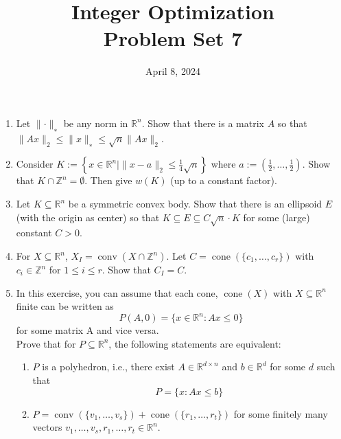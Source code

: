 \documentclass[11pt,a4paper]{article}
\title{Integer Optimization  \\ Problem Set 7 }
\date{ April 8, 2024}
\renewcommand{\leq}{\leqslant}
\DeclareMathOperator{\conv}{conv}
\DeclareMathOperator{\cone}{cone}
\begin{document}
\maketitle 


\begin{enumerate}

\item Let $∥\cdot∥_∗$ be any norm in $\mathbb{R}^n$. Show that there is a matrix $A$ so that $∥Ax∥_2 \leq ∥x∥_∗ \leq \sqrt{n}∥Ax∥_2$.

\item Consider $K:= \left\{x∈\mathbb{R}^n |∥x−a∥_2 \leq \frac{1}{4}\sqrt{n}\right\}$ where $a:=\left(\frac{1}{2},\hdots,\frac{1}{2}\right)$. Show that $K∩\mathbb{Z}^n =\emptyset$. Then give $w(K)$ (up to a constant factor).

\item Let $K ⊆\mathbb{R}^n$ be a symmetric convex body. Show that there is an ellipsoid $E$ (with the origin as center) so that $K ⊆ E ⊆ C\sqrt{n}\cdot K$ for some (large) constant $C >0$.

\item For $X⊆\mathbb{R}^n$, $X_I=\conv(X∩\mathbb{Z}^n)$.
Let $C=\cone(\{c_1,\hdots,c_r\})$ with $c_i ∈ \mathbb{Z}^n$ for $1\leq i\leq r$. Show that $C_I =C$.

\item In this exercise, you can assume that each cone, $\cone(X)$ with $X ⊆ \mathbb{R}^n$ finite can be written as $$P(A,0)=\{x∈\mathbb{R}^n: Ax\leq 0\}$$ for some matrix A and vice versa. \\
Prove that for $P ⊆ \mathbb{R}^n$, the following statements are equivalent:
\begin{enumerate}
    \item $P$ is a polyhedron, i.e., there exist $A ∈ \mathbb{R}^{d×n}$ and $b ∈ \mathbb{R}^d$ for some $d$ such that
$$P =\{x:Ax\leq b\}$$
\item $P =\conv(\{v_1,\hdots,v_s\})+\cone(\{r_1,\hdots,r_t\})$ for some finitely many vectors $v_1, \hdots, v_s, r_1, \hdots, r_t \in \mathbb{R}^n$. 
\end{enumerate}

\end{enumerate}


%
%


 
\end{document}
